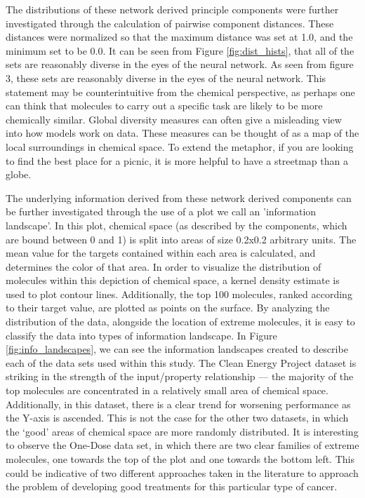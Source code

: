 The distributions of these network derived principle components were further investigated through the calculation of pairwise component distances. These distances were normalized so that the maximum distance was set at 1.0, and the minimum set to be 0.0. It can be seen from Figure \ref{fig:dist_hists}, that all of the sets are reasonably diverse in the eyes of the neural network.  As seen from figure 3, these sets are reasonably diverse in the eyes of the neural network. This statement may be counterintuitive from the chemical perspective, as perhaps one can think that molecules to carry out a specific task are likely to be more chemically similar. Global diversity measures can often give a misleading view into how models work on data. These measures can be thought of as a map of the local surroundings in chemical space.  To extend the metaphor, if you are looking to find the best place for a picnic, it is more helpful to have a streetmap than a globe.

The underlying information derived from these network derived components can be further investigated through the use of a plot we call an 'information landscape'.  In this plot, chemical space (as described by the components, which are bound between 0 and 1) is split into areas of size 0.2x0.2 arbitrary units. The mean value for the targets contained within each area is calculated, and determines the color of that area.  In order to visualize the distribution of molecules within this depiction of chemical space, a kernel density estimate is used to plot contour lines.  Additionally, the top 100 molecules, ranked according to their target value, are plotted as points on the surface.  By analyzing the distribution of the data, alongside the location of extreme molecules, it is easy to classify the data into types of information landscape.  In Figure \ref{fig:info_landscapes}, we can see the information landscapes created to describe each of the data sets used within this study.  The Clean Energy Project dataset is striking in the strength of the input/property relationship --- the majority of the top molecules are concentrated in a relatively small area of chemical space.  Additionally, in this dataset, there is a clear trend for worsening performance as the Y-axis is ascended.  This is not the case for the other two datasets, in which the `good' areas of chemical space are more randomly distributed.  It is interesting to observe the One-Dose data set, in which there are two clear families of extreme molecules, one towards the top of the plot and one towards the bottom left.  This could be indicative of two different approaches taken in the literature to approach the problem of developing good treatments for this particular type of cancer.